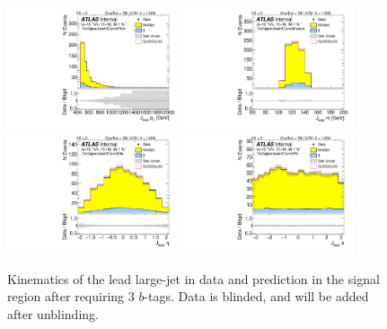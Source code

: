 \clearpage

\begin{figure}[htbp!]
\begin{center}
\includegraphics[width=0.45\textwidth,angle=-90]{figures/boosted/Signal/b77_ThreeTag_Signal_leadHCand_Pt_m_blind.pdf}
\includegraphics[width=0.45\textwidth,angle=-90]{figures/boosted/Signal/b77_ThreeTag_Signal_leadHCand_Mass_s_blind.pdf}\\
\includegraphics[width=0.45\textwidth,angle=-90]{figures/boosted/Signal/b77_ThreeTag_Signal_leadHCand_Eta_blind.pdf}
\includegraphics[width=0.45\textwidth,angle=-90]{figures/boosted/Signal/b77_ThreeTag_Signal_leadHCand_Phi_blind.pdf}
  \caption{Kinematics of the lead large-\R jet in data and prediction in the signal region after requiring 3 $b$-tags. Data is blinded, and will be added after unblinding.}
  \label{fig:boosted-3b-signal-blind-ak10-lead}
\end{center}
\end{figure}

